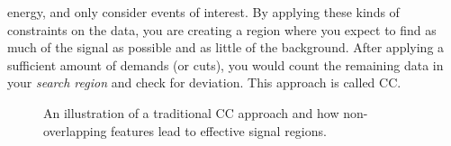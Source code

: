 energy, and only consider events of interest. By applying these kinds of constraints on the data, 
you are creating a region where you expect to find as much of the signal as possible and as little 
of the background. After applying a sufficient amount of demands (or cuts), you would count the 
remaining data in your \emph{search region} and check for deviation. This approach is called \ac{CC}.
\\
\begin{figure} 
    \centering
    \caption{An illustration of a traditional \acs{CC} approach and how non-overlapping features lead to effective
    signal regions.}
    \label{fig:overlap}
\end{figure}
